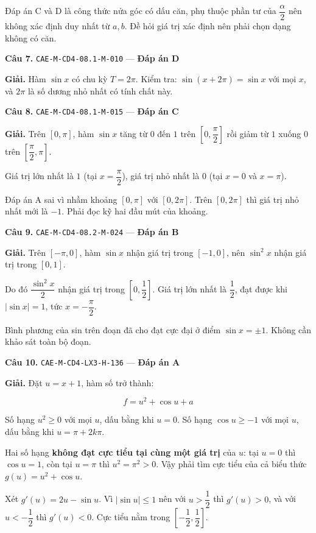 \documentclass[11pt, a4paper]{article}
\begin{document}
 Đáp án C và D là công thức nửa góc có dấu căn, phụ thuộc phần tư của $\dfrac{\alpha}{2}$ nên không xác định duy nhất từ $a, b$. Đề hỏi giá trị xác định nên phải chọn dạng không có căn.

\textbf{Câu 7.} \texttt{CAE-M-CD4-08.1-M-010} — \textbf{Đáp án D}

\textbf{Giải.} Hàm $\sin x$ có chu kỳ $T = 2\pi$. Kiểm tra: $\sin(x + 2\pi) = \sin x$ với mọi $x$, và $2\pi$ là số dương nhỏ nhất có tính chất này.

\textbf{Câu 8.} \texttt{CAE-M-CD4-08.1-M-015} — \textbf{Đáp án C}

\textbf{Giải.} Trên $[0, \pi]$, hàm $\sin x$ tăng từ $0$ đến $1$ trên $\left[0, \dfrac{\pi}{2}\right]$ rồi giảm từ $1$ xuống $0$ trên $\left[\dfrac{\pi}{2}, \pi\right]$.

Giá trị lớn nhất là $1$ (tại $x = \dfrac{\pi}{2}$), giá trị nhỏ nhất là $0$ (tại $x = 0$ và $x = \pi$).

 Đáp án A sai vì nhầm khoảng $[0, \pi]$ với $[0, 2\pi]$. Trên $[0, 2\pi]$ thì giá trị nhỏ nhất mới là $-1$. Phải đọc kỹ hai đầu mút của khoảng.

\textbf{Câu 9.} \texttt{CAE-M-CD4-08.2-M-024} — \textbf{Đáp án B}

\textbf{Giải.} Trên $[-\pi, 0]$, hàm $\sin x$ nhận giá trị trong $[-1, 0]$, nên $\sin^2 x$ nhận giá trị trong $[0, 1]$.

Do đó $\dfrac{\sin^2 x}{2}$ nhận giá trị trong $\left[0, \dfrac{1}{2}\right]$. Giá trị lớn nhất là $\dfrac{1}{2}$, đạt được khi $|\sin x| = 1$, tức $x = -\dfrac{\pi}{2}$.

 Bình phương của sin trên đoạn đã cho đạt cực đại ở điểm $\sin x = \pm 1$. Không cần khảo sát toàn bộ đoạn.

\textbf{Câu 10.} \texttt{CAE-M-CD4-LX3-H-136} — \textbf{Đáp án A}

\textbf{Giải.} Đặt $u = x + 1$, hàm số trở thành:

$$f = u^2 + \cos u + a$$

Số hạng $u^2 \ge 0$ với mọi $u$, dấu bằng khi $u = 0$. Số hạng $\cos u \ge -1$ với mọi $u$, dấu bằng khi $u = \pi + 2k\pi$.

Hai số hạng \textbf{không đạt cực tiểu tại cùng một giá trị} của $u$: tại $u = 0$ thì $\cos u = 1$, còn tại $u = \pi$ thì $u^2 = \pi^2 > 0$. Vậy phải tìm cực tiểu của cả biểu thức $g(u) = u^2 + \cos u$.

Xét $g'(u) = 2u - \sin u$. Vì $|\sin u| \le 1$ nên với $u > \dfrac{1}{2}$ thì $g'(u) > 0$, và với $u < -\dfrac{1}{2}$ thì $g'(u) < 0$. Cực tiểu nằm trong $\left[-\dfrac{1}{2}, \dfrac{1}{2}\right]$.
\end{document}
